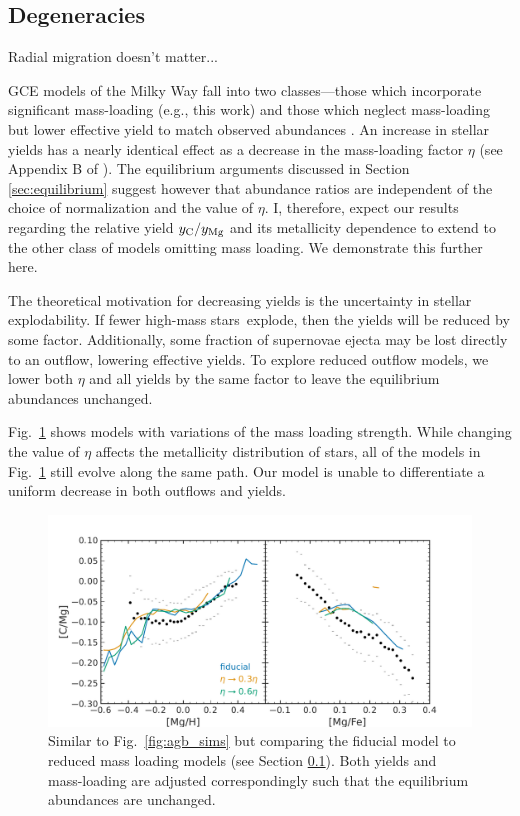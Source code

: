 \documentclass[fleqn,usenatbib]{mnras}
\newcommand{\gce}{GCE}
\newcommand{\hms}{high-mass stars}
\begin{document}
\subsection{Degeneracies} \label{sec:outflows}

Radial migration doesn't matter...

\gce{} models of the Milky Way fall into two classes---those which incorporate significant mass-loading (e.g., this work) and those which neglect mass-loading but lower effective yield to match observed abundances \citep[e.g.][]{MCM13, MCM14, spitoni19, spitoni20, spitoni21}.
An increase in stellar yields has a nearly identical effect as a decrease in the mass-loading factor $\eta$ (see Appendix B of \citealt{james_dwarf}).
The equilibrium arguments discussed in Section \ref{sec:equilibrium} suggest however that abundance ratios are independent of the choice of normalization and the value of $\eta$. I, therefore, expect our results regarding the relative yield $y_{\rm C}/y_{\rm Mg}$ and its metallicity dependence to extend to the other class of models omitting mass loading. We demonstrate this further here.

The theoretical motivation for decreasing yields is the uncertainty in stellar explodability.
If fewer \hms\ explode, then the yields will be reduced by some factor. Additionally, some fraction of supernovae ejecta may be lost directly to an outflow, lowering effective yields. To explore reduced outflow models, we lower both $\eta$ and all yields by the same factor to leave the equilibrium abundances unchanged. 

Fig.~\ref{fig:eta} shows models with variations of the mass loading strength. While changing the value of $\eta$ affects the metallicity distribution of stars, all of the models in Fig.~\ref{fig:eta} still evolve along the same path. Our model is unable to differentiate a uniform decrease in both outflows and yields.

\begin{figure}
    \centering
    \includegraphics{eta.pdf}
    \caption[Reduced-Outflow Models]{Similar to Fig.~\ref{fig:agb_sims} but comparing the fiducial model to reduced mass loading models (see Section  \ref{sec:outflows}). Both yields and mass-loading are adjusted correspondingly such that the equilibrium abundances are unchanged. }
    \label{fig:eta}
\end{figure}
\end{document}
